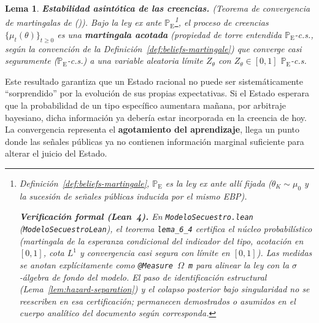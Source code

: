\documentclass[12pt]{article}
\newtheorem{lemma}[theorem]{Lema}
\theoremstyle{definition}
\theoremstyle{remark}
\newcommand{\ProbE}{\mathbb{P}_{\mathrm{E}}}
\newcommand{\1}{\mathbf{1}}
\begin{document}
\theoremstyle{lemmanoparenouter}
\begin{lemma}{\textbf{Estabilidad asintótica de las creencias.} \textnormal{(Teorema de convergencia de martingalas de \citeauthor{Doob1953Stochastic} (\citeyear{Doob1953Stochastic})).}}
\label{lem:asymptotic-beliefs}
Bajo la ley ex ante $\ProbE$\footnote{Definición~\ref{def:beliefs-martingale}, $\ProbE$ es la ley ex ante allí fijada \textup{(}$\theta_K\sim\mu_0$ y la sucesión de señales públicas inducida por el mismo EBP\textup{)}.\par\smallskip\textbf{Verificación formal \textup{(}Lean~4\textup{)}.} En \texttt{ModeloSecuestro.lean} \textup{(}\texttt{ModeloSecuestroLean}\textup{)}, el teorema \texttt{lema\_6\_4} certifica el núcleo probabilístico \textup{(}martingala de la esperanza condicional del indicador del tipo, acotación en $[0,1]$, cota $L^1$ y convergencia casi segura con límite en $[0,1]$\textup{)}. Las medidas se anotan explícitamente como \texttt{@Measure }$\Omega$\texttt{ m} para alinear la ley con la $\sigma$-álgebra de fondo del modelo. El paso de identificación estructural \textup{(}Lema~\ref{lem:hazard-separation}\textup{)} y el colapso posterior bajo singularidad no se reescriben en esa certificación; permanecen demostrados o asumidos en el cuerpo analítico del documento según corresponda.}, el proceso de creencias $\{\mu_t(\theta)\}_{t\ge 0}$ es una \textbf{martingala acotada} \textup{(}propiedad de torre entendida $\ProbE$-c.s., según la convención de la Definición~\ref{def:beliefs-martingale}\textup{)} que converge casi seguramente \textup{(}$\ProbE$-c.s.\textup{)} a una variable aleatoria límite $Z_\theta$ con $Z_\theta\in[0,1]$ $\ProbE$-c.s.
\end{lemma}
\theoremstyle{plain}

Este resultado garantiza que un Estado racional no puede ser sistemáticamente ``sorprendido'' por la evolución de sus propias expectativas. Si el Estado esperara que la probabilidad de un tipo específico aumentara mañana, por arbitraje bayesiano, dicha información ya debería estar incorporada en la creencia de hoy. La convergencia representa el \textbf{agotamiento del aprendizaje}, llega un punto donde las señales públicas ya no contienen información marginal suficiente para alterar el juicio del Estado.
\end{document}
